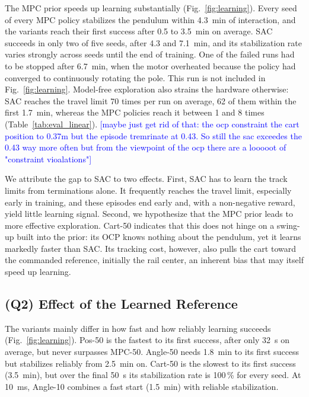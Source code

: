 \documentclass{l4dc2027}
\newcommand{\zopangle}{Angle-50\xspace}
\newcommand{\zoppos}{Pos-50\xspace}
\newcommand{\zopcart}{Cart-50\xspace}
\newcommand{\zopangleten}{Angle-10\xspace}
\newcommand{\mpcfifty}{MPC-50\xspace}
\newcommand{\note}[1]{\textcolor{blue}{[#1]}}
\begin{document}
The MPC prior speeds up learning substantially (Fig.~\ref{fig:learning}).
Every seed of every \ac{MPC} policy stabilizes the pendulum within 4.3~min of interaction, and
the variants reach their first success after 0.5 to 3.5~min on average. SAC
succeeds in only two of five seeds, after 4.3 and 7.1~min, and its
stabilization rate varies strongly across seeds until the end of training. One
of the failed runs had to be stopped after 6.7~min, when the motor overheated
because the policy had converged to continuously rotating the pole. This run is
not included in Fig.~\ref{fig:learning}. Model-free exploration also strains
the hardware otherwise: SAC reaches the travel limit 70 times per run on
average, 62 of them within the first 1.7~min, whereas the \ac{MPC} policies
reach it between 1 and 8 times (Table~\ref{tab:eval_linear}). \note{maybe just get rid of that: the ocp constraint the cart position to 0.37m but the episode tremrinate at 0.43. So still the sac exceedes the 0.43 way more often but from the viewpoint of the ocp there are a looooot of "constraint vioalations"}

We attribute the gap to SAC to two effects. First, SAC has to learn the track
limits from terminations alone. It frequently reaches the travel limit,
especially early in training, and these episodes end early and, with a
non-negative reward, yield little learning signal. Second, we hypothesize that
the MPC prior leads to more effective exploration. \zopcart indicates that
this does not hinge on a swing-up built into the prior: its OCP knows nothing
about the pendulum, yet it learns markedly faster than SAC. Its tracking cost,
however, also pulls the cart toward the commanded reference, initially the
rail center, an inherent bias that may itself speed up learning.


\subsection{(Q2) Effect of the Learned Reference}
\label{sec:res-interfaces}

The variants mainly differ in how fast and how reliably learning succeeds
(Fig.~\ref{fig:learning}). \zoppos is the fastest to its first success, after
only 32~s on average, but never surpasses \mpcfifty. \zopangle needs 1.8~min to
its first success but stabilizes reliably from 2.5~min on. \zopcart is the
slowest to its first success (3.5~min), but over the final 50~s its
stabilization rate is 100\,\% for every seed. At 10~ms, \zopangleten combines
a fast start (1.5~min) with reliable stabilization.
\end{document}
